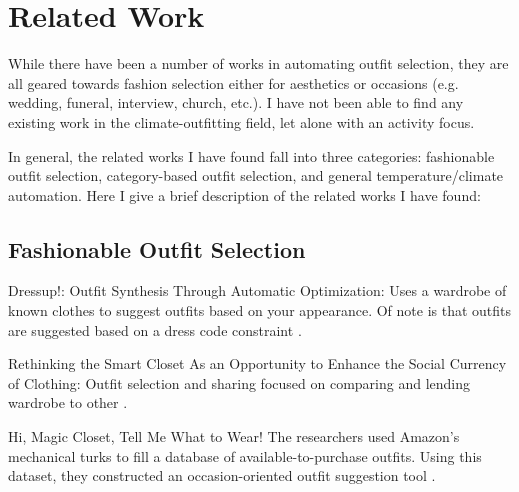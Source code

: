 \section{Related Work}
\label{section:relatedwork}
While there have been a number of works in automating outfit selection, they are all geared towards
fashion selection either for aesthetics or occasions (e.g. wedding, funeral, interview, church, etc.).
I have not been able to find any existing work in the climate-outfitting field, let alone with an
activity focus.

In general, the related works I have found fall into three categories: fashionable outfit selection, category-based 
outfit selection, and general temperature/climate automation. Here I give a brief description of the related works
I have found:

\subsection{Fashionable Outfit Selection}
\begin{description}
  \item{Dressup!: Outfit Synthesis Through Automatic Optimization:} Uses a wardrobe of known clothes to suggest 
  outfits based on your appearance. Of note is that outfits are suggested based on a dress code constraint \cite{Dressup}.
  \item{Rethinking the Smart Closet As an Opportunity to Enhance the Social Currency of Clothing:} Outfit selection and 
  sharing focused on comparing and lending wardrobe to other \cite{SmartCloset}.
  \item{Hi, Magic Closet, Tell Me What to Wear!} The researchers used Amazon's mechanical turks to fill a database
  of available-to-purchase outfits. Using this dataset, they constructed an occasion-oriented outfit suggestion
  tool \cite{MagicCloset}.
\end{description}

